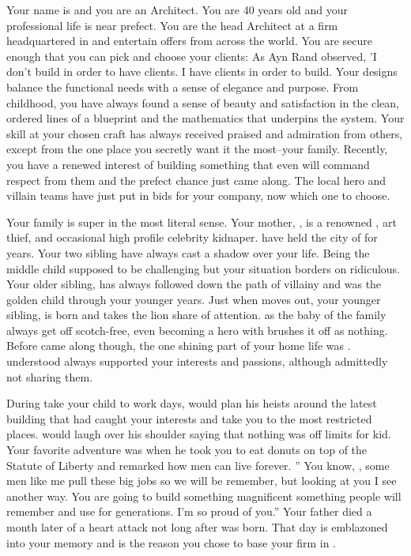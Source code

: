 \documentclass[char]{LRSguildcamp1}
\begin{document}
\name{\cArchitect{}}


Your name is \cArchitect{} and you are an Architect. You are 40 years old and your professional life is near prefect. You are the head Architect at a firm headquartered in  and entertain offers from across the world.  You are secure enough that you can pick and choose your clients: As Ayn Rand observed, 'I don't build in order to have clients. I have clients in order to build. Your designs balance the functional needs with a sense of elegance and purpose. From childhood, you have always found a sense of beauty and satisfaction in the clean, ordered lines of a blueprint and the mathematics that underpins the system. Your skill at your chosen craft has always received praised and admiration from others, except from the one place you secretly want it the most--your family. Recently, you have a renewed interest of building something that even will command respect from them and the prefect chance just came along. The local hero and villain teams have just put in bids for your company, now which one to choose.

Your family is super in the most literal sense. Your mother, \cGrandma{}, is a renowned \cGrandma{\villain}, art thief, and occasional high profile celebrity kidnaper. \cGrandma{\they} have held the city of  for years. Your two sibling have always cast a shadow over your life. Being the middle child supposed to be challenging but your situation borders on ridiculous. Your older sibling, \cOldest{} has always followed \cGrandma{} down the path of villainy and was the golden child through your younger years. Just when \cOldest{} moves out, your younger sibling, \cYoungest{} is born and takes the lion share of attention.  as the baby of the family always get off scotch-free, even becoming a hero with \cGrandma{} brushes it off as nothing. Before \cYoungest{} came along though, the one shining part of your home life was \cGrandpa{}. \cGrandpa{} understood always supported your interests and passions, although admittedly not sharing them. 

During take your child to work days, \cGrandpa{} would plan his heists around the latest building that had caught your interests and take you to the most restricted places. \cGrandpa{} would laugh over his shoulder saying that nothing was off limits for  kid. Your favorite adventure was when he took you to eat donuts on top of the Statute of Liberty and remarked how men can live forever.  '' You know, \cArchitect{}, some men like me pull these big jobs so we will be remember, but looking at you I see another way. You are going to build something magnificent something people will remember and use for generations. I'm so proud of you.'' Your father died a month later of a heart attack not long after \cYoungest{} was born. That day is emblazoned into your memory and is the reason you chose to base your firm in \pCityArchitect{}.
\end{document}
